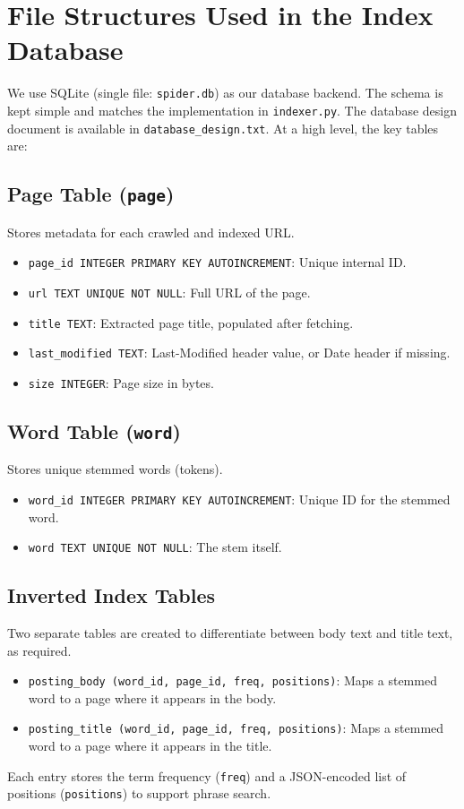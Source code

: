 \documentclass[11pt,a4paper]{article}
\begin{document}
\section{File Structures Used in the Index Database}
We use SQLite (single file: \texttt{spider.db}) as our database backend. The schema is kept simple and matches the implementation in \texttt{indexer.py}. The database design document is available in \texttt{database\_design.txt}. At a high level, the key tables are:

\subsection{Page Table (\texttt{page})}
Stores metadata for each crawled and indexed URL.
\begin{itemize}
    \item \texttt{page\_id INTEGER PRIMARY KEY AUTOINCREMENT}: Unique internal ID.
    \item \texttt{url TEXT UNIQUE NOT NULL}: Full URL of the page.
    \item \texttt{title TEXT}: Extracted page title, populated after fetching.
    \item \texttt{last\_modified TEXT}: Last-Modified header value, or Date header if missing.
    \item \texttt{size INTEGER}: Page size in bytes.
\end{itemize}

\subsection{Word Table (\texttt{word})}
Stores unique stemmed words (tokens).
\begin{itemize}
    \item \texttt{word\_id INTEGER PRIMARY KEY AUTOINCREMENT}: Unique ID for the stemmed word.
    \item \texttt{word TEXT UNIQUE NOT NULL}: The stem itself.
\end{itemize}

\subsection{Inverted Index Tables}
Two separate tables are created to differentiate between body text and title text, as required.
\begin{itemize}
    \item \texttt{posting\_body (word\_id, page\_id, freq, positions)}: Maps a stemmed word to a page where it appears in the body.
    \item \texttt{posting\_title (word\_id, page\_id, freq, positions)}: Maps a stemmed word to a page where it appears in the title.
\end{itemize}
Each entry stores the term frequency (\texttt{freq}) and a JSON-encoded list of positions (\texttt{positions}) to support phrase search.
\end{document}
